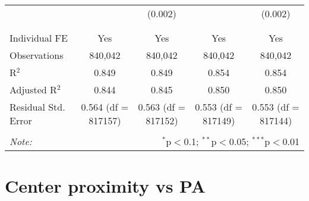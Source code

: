 \documentclass[
]{article}
\begin{document}
\begin{table}[!htbp]
{\begin{tabular}{@{\extracolsep{5pt}}lcccc}
  &  & (0.002) &  & (0.002) \\ 
  & & & & \\ 
\hline \\[-1.8ex] 
Individual FE & Yes & Yes & Yes & Yes \\ 
Observations & 840,042 & 840,042 & 840,042 & 840,042 \\ 
R$^{2}$ & 0.849 & 0.849 & 0.854 & 0.854 \\ 
Adjusted R$^{2}$ & 0.844 & 0.845 & 0.850 & 0.850 \\ 
Residual Std. Error & 0.564 (df = 817157) & 0.563 (df = 817152) & 0.553 (df = 817149) & 0.553 (df = 817144) \\ 
\hline 
\hline \\[-1.8ex] 
\textit{Note:}  & \multicolumn{4}{r}{$^{*}$p$<$0.1; $^{**}$p$<$0.05; $^{***}$p$<$0.01} \\ 
\end{tabular}
} 
\end{table} 
\newpage
\section{Center proximity vs PA}
\end{document}
